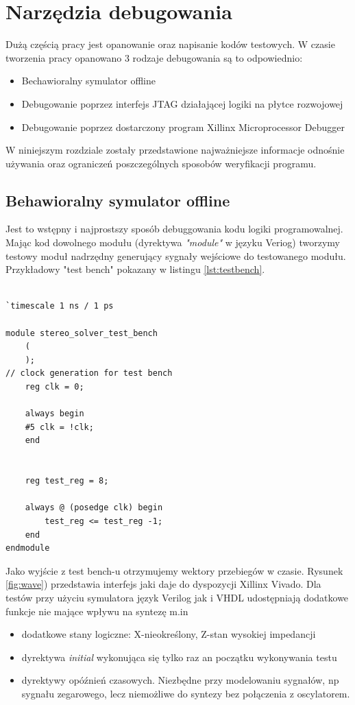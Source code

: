 \section{Narzędzia debugowania}
\label{sec:logika:debug}

Dużą częścią pracy jest opanowanie oraz napisanie kodów testowych.
W czasie tworzenia pracy opanowano 3 rodzaje debugowania są to odpowiednio:
\begin{itemize}
\item Bechawioralny symulator offline
\item Debugowanie poprzez interfejs JTAG działającej logiki na płytce rozwojowej
\item Debugowanie poprzez dostarczony program Xillinx Microprocessor Debugger
\end{itemize}
W niniejszym rozdziale zostały przedstawione najważniejsze informacje odnośnie używania
oraz ograniczeń poszczególnych sposobów weryfikacji programu.

\subsection{Behawioralny symulator offline}
\label{sec:logika:debug:simulation}

Jest to wstępny i najprostszy sposób debuggowania kodu logiki programowalnej.
Mając kod dowolnego modułu (dyrektywa \textit{"module"} w języku Veriog) tworzymy
testowy moduł nadrzędny generujący sygnały wejściowe do testowanego modułu.
Przykładowy "test bench" pokazany w listingu \ref{lst:testbench}.

\begin{lstlisting}[label={lst:testbench},
    caption={Przykładowy fragment kody Verilog użytego jako test bench}]

`timescale 1 ns / 1 ps

module stereo_solver_test_bench
    (
    );
// clock generation for test bench	
    reg clk = 0;

    always begin
    #5 clk = !clk;	
    end
	

    reg test_reg = 8;

    always @ (posedge clk) begin
        test_reg <= test_reg -1;
    end
endmodule
\end{lstlisting}

Jako wyjście z test bench-u otrzymujemy wektory przebiegów w czasie.
Rysunek \ref{fig:wave}) przedstawia interfejs jaki daje do dyspozycji Xillinx Vivado.
Dla testów przy użyciu symulatora język Verilog jak i VHDL udostępniają dodatkowe
funkcje nie mające wpływu na syntezę m.in
\begin{itemize}
\item dodatkowe stany logiczne: X-nieokreślony, Z-stan wysokiej impedancji
\item dyrektywa \textit{initial} wykonująca się tylko raz an początku wykonywania testu
\item dyrektywy opóźnień czasowych. Niezbędne przy modelowaniu sygnałów, np sygnału
zegarowego, lecz niemożliwe do syntezy bez połączenia z oscylatorem.
\end{itemize}

